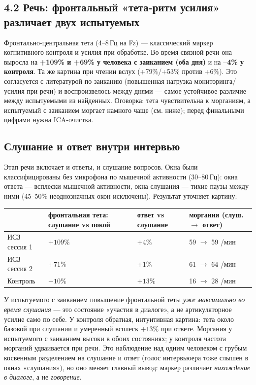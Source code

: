 \documentclass[11pt,a4paper]{article}
\begin{document}
\subsection*{4.2 Речь: фронтальный «тета-ритм усилия» различает двух испытуемых}
Фронтально-центральная тета (4--8\,Гц на Fz) --- классический маркер когнитивного контроля и
усилия при обработке. Во время связной речи она выросла на \textbf{+109\% и +69\% у человека
с заиканием (оба дня)} и на \textbf{--4\% у контроля}. Та же картина при чтении вслух
(+79\%/+53\% против +6\%). Это согласуется с литературой по заиканию (повышенная нагрузка
мониторинга/усилия при речи) и воспроизвелось между днями --- самое устойчивое различие между
испытуемыми из найденных. Оговорка: тета чувствительна к морганиям, а испытуемый с заиканием моргает
намного чаще (см. ниже); перед финальными цифрами нужна ICA-очистка.

\subsection*{Слушание и ответ внутри интервью}
Этап речи включает и ответы, и слушание вопросов. Окна были классифицированы без микрофона по
мышечной активности (30--80\,Гц): окна ответа --- всплески мышечной активности, окна слушания ---
тихие паузы между ними (45--50\% неоднозначных окон исключены). Результат уточняет картину:
\begin{center}\small
\begin{tabular}{@{}llll@{}}
\toprule
& фронтальная тета: слушание vs покой & ответ vs слушание & моргания (слуш. $\to$ ответ) \\
\midrule
ИСЗ сессия 1 & $+109\%$ & $+4\%$ & 59 $\to$ 59 /мин \\
ИСЗ сессия 2 & $+71\%$ & $+1\%$ & 61 $\to$ 64 /мин \\
Контроль & $-10\%$ & $+13\%$ & 16 $\to$ 28 /мин \\
\bottomrule
\end{tabular}
\end{center}
У испытуемого с заиканием повышение фронтальной теты \emph{уже максимально во время слушания} ---
это состояние «участия в диалоге», а не артикуляторное усилие само по себе. У контроля обратная,
интуитивная картина: тета около базовой при слушании и умеренный всплеск $+13\%$ при ответе.
Моргания у испытуемого с заиканием высоки в обоих состояниях; у контроля частота морганий
удваивается при речи. Это наблюдение над одним человеком с грубым косвенным разделением на слушание и ответ
(голос интервьюера тоже слышен в окнах «слушания»), но оно меняет главный вывод: маркер различает
\emph{нахождение в диалоге}, а не \emph{говорение}.
\end{document}
